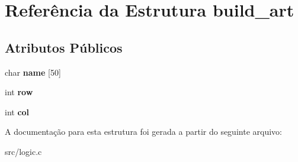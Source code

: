 \hypertarget{structbuild__art}{\section{\-Referência da \-Estrutura build\-\_\-art}
\label{structbuild__art}
}
\subsection*{\-Atributos \-Públicos}
\begin{DoxyCompactItemize}
\item 
\hypertarget{structbuild__art_affeeed4903b4badb363ccace6b456900}{char {\bfseries name} \mbox{[}50\mbox{]}}\label{structbuild__art_affeeed4903b4badb363ccace6b456900}

\item 
\hypertarget{structbuild__art_a169ece7ce0f8e238533aa34213275c28}{int {\bfseries row}}\label{structbuild__art_a169ece7ce0f8e238533aa34213275c28}

\item 
\hypertarget{structbuild__art_a5513f46449eef215cab05654b4d0cecf}{int {\bfseries col}}\label{structbuild__art_a5513f46449eef215cab05654b4d0cecf}

\end{DoxyCompactItemize}


\-A documentação para esta estrutura foi gerada a partir do seguinte arquivo\-:\begin{DoxyCompactItemize}
\item 
src/logic.\-c\end{DoxyCompactItemize}
